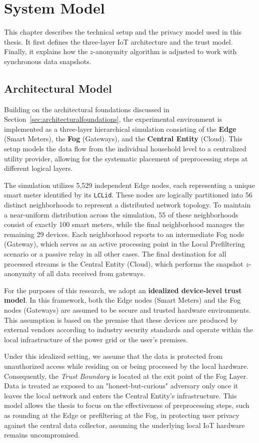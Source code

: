\chapter{System Model}
This chapter describes the technical setup and the privacy model used in this thesis. It first defines the three-layer \ac{IoT} architecture and the trust model. Finally, it explains how the $z$-anonymity algorithm is adjusted to work with synchronous data snapshots.

\section{Architectural Model}
\label{sec:system_model}
Building on the architectural foundations discussed in Section~\ref{sec:architecturalfoundations}, the experimental environment is implemented as a three-layer hierarchical simulation consisting of the \textbf{Edge} (Smart Meters), the \textbf{Fog} (Gateways), and the \textbf{Central Entity} (Cloud). This setup models the data flow from the individual household level to a centralized utility provider, allowing for the systematic placement of preprocessing steps at different logical layers.

The simulation utilizes 5,529 independent Edge nodes, each representing a unique smart meter identified by its \texttt{LCLid}. These nodes are logically partitioned into 56 distinct neighborhoods to represent a distributed network topology. To maintain a near-uniform distribution across the simulation, 55 of these neighborhoods consist of exactly 100 smart meters, while the final neighborhood manages the remaining 29 devices. Each neighborhood reports to an intermediate Fog node (Gateway), which serves as an active processing point in the Local Prefiltering scenario or a passive relay in all other cases. The final destination for all processed streams is the Central Entity (Cloud), which performs the snapshot $z$-anonymity of all data received from gateways.

For the purposes of this research, we adopt an \textbf{idealized device-level trust model}. In this framework, both the Edge nodes (Smart Meters) and the Fog nodes (Gateways) are assumed to be secure and trusted hardware environments. This assumption is based on the premise that these devices are produced by external vendors according to industry security standards and operate within the local infrastructure of the power grid or the user's premises.


Under this idealized setting, we assume that the data is protected from unauthorized access while residing on or being processed by the local hardware. Consequently, the \textit{Trust Boundary} is located at the exit point of the Fog Layer. Data is treated as exposed to an "honest-but-curious" adversary only once it leaves the local network and enters the Central Entity's infrastructure. This model allows the thesis to focus on the effectiveness of preprocessing steps, such as rounding at the Edge or prefiltering at the Fog, in protecting user privacy against the central data collector, assuming the underlying local \ac{IoT} hardware remains uncompromised.



